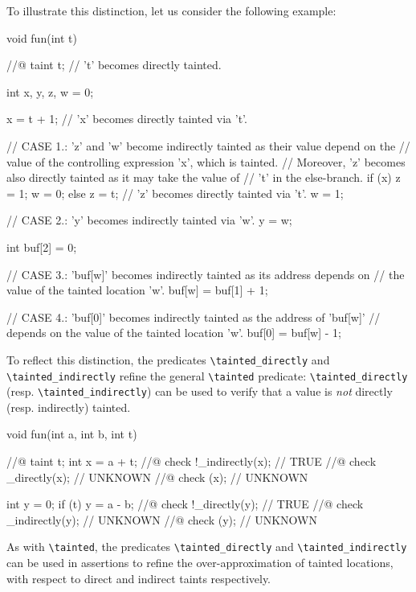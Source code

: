 \documentclass{frama-c-book}
\begin{document}
To illustrate this distinction, let us consider the following example:
\begin{listing-nonumber}
void fun(int t) {
  //@ taint t;                // 't' becomes directly tainted.

  int x, y, z, w = 0;

  x = t + 1;                  // 'x' becomes directly tainted via 't'.

  // CASE 1.: 'z' and 'w' become indirectly tainted as their value depend on the
  // value of the controlling expression 'x', which is tainted.
  // Moreover, 'z' becomes also directly tainted as it may take the value of
  // 't' in the else-branch. 
  if (x) {
    z = 1;
    w = 0;
  }
  else {
    z = t;                    // 'z' becomes directly tainted via 't'.
    w = 1;
  }

  // CASE 2.: 'y' becomes indirectly tainted via 'w'.
  y = w;

  int buf[2] = {0};

  // CASE 3.: 'buf[w]' becomes indirectly tainted as its address depends on
  // the value of the tainted location 'w'.
  buf[w] = buf[1] + 1;

  // CASE 4.: 'buf[0]' becomes indirectly tainted as the address of 'buf[w]'
  // depends on the value of the tainted location 'w'.
  buf[0] = buf[w] - 1;
}
\end{listing-nonumber}

To reflect this distinction, the predicates \lstinline|\tainted_directly| and
\lstinline|\tainted_indirectly| refine the general \lstinline|\tainted|
predicate: \lstinline|\tainted_directly| (resp. \lstinline|\tainted_indirectly|)
can be used to verify that a value is \emph{not} directly (resp. indirectly)
tainted.

\begin{listing-nonumber}
  void fun(int a, int b, int t) {
    //@ taint t;
    int x = a + t;
    //@ check !\tainted_indirectly(x);  // TRUE
    //@ check \tainted_directly(x);     // UNKNOWN
    //@ check \tainted(x);              // UNKNOWN

    int y = 0;
    if (t)
      y = a - b;
    //@ check !\tainted_directly(y);    // TRUE
    //@ check \tainted_indirectly(y);   // UNKNOWN
    //@ check \tainted(y);              // UNKNOWN
  }
\end{listing-nonumber}

As with \lstinline|\tainted|, the predicates \lstinline|\tainted_directly| and
\lstinline|\tainted_indirectly| can be used in \acsl{} assertions to refine the
over-approximation of tainted locations, with respect to direct and indirect
taints respectively.
\end{document}
